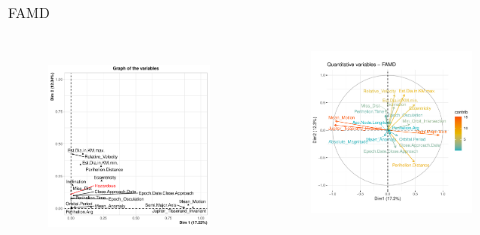 \documentclass{beamer}
\begin{document}
\begin{frame}{FAMD }
\begin{columns}  

    \begin{figure}[h]
\begin{center}
\includegraphics[width=1\textwidth]{Pic/FAMD.pdf}
\label{FADM}
\end{center}
\end{figure}
 \begin{figure}[h]
\begin{center}
\includegraphics[width=1\textwidth]{Pic/FAMD_Quantitative variables.pdf}

\end{center}
\end{figure}
\end{columns}
\end{frame}
\end{document}
